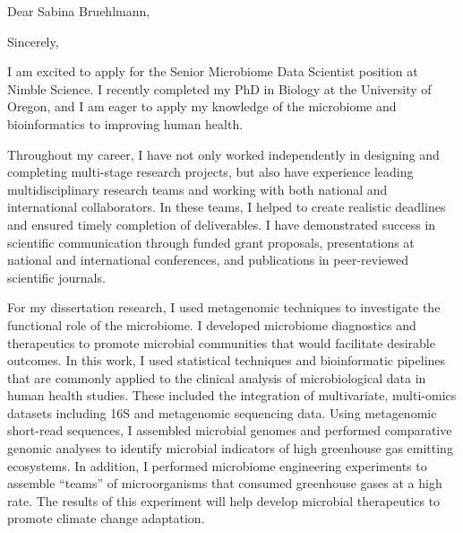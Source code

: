 \documentclass[11pt,letterpaper,sans]{moderncv}        %
\begin{document}

\clearpage
\date{April 4, 2023}
\opening{Dear Sabina Bruehlmann,}
\closing{Sincerely,}
\makelettertitle

I am excited to apply for the Senior Microbiome Data Scientist position at Nimble Science.
I recently completed my PhD in Biology at the University of Oregon, and I am
eager to apply my knowledge of the microbiome and bioinformatics to improving
human health.

Throughout my career, I have not only worked independently in designing and
completing multi-stage research projects, but also have experience leading
multidisciplinary research teams and working with both national and
international collaborators. In these teams, I helped to create realistic
deadlines and ensured timely completion of deliverables. I have demonstrated
success in scientific communication through funded grant proposals,
presentations at national and international conferences, and publications in
peer-reviewed scientific journals. 

For my dissertation research, I used metagenomic techniques to investigate the 
functional role of the microbiome. I developed microbiome diagnostics and therapeutics to promote microbial 
communities that would facilitate desirable outcomes. 
In this work, I used statistical techniques and bioinformatic
pipelines that are commonly applied to the clinical analysis of microbiological
data in human health studies. These included the integration of multivariate,
multi-omics datasets including 16S and metagenomic sequencing data. Using
metagenomic short-read sequences, I assembled microbial genomes and performed
comparative genomic analyses to identify microbial indicators of high
greenhouse gas emitting ecosystems. In addition, I performed microbiome engineering
experiments to assemble ``teams'' of microorganisms that consumed greenhouse
gases at a high rate. The results of this experiment will help develop
microbial therapeutics to promote climate change adaptation.
\end{document}
